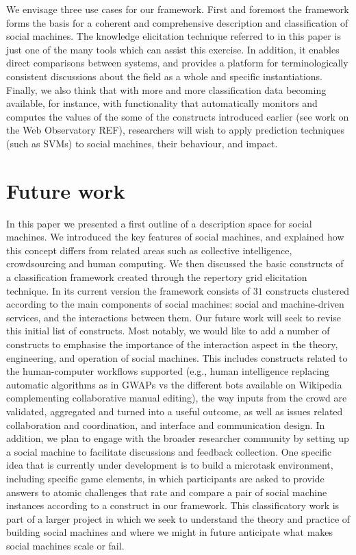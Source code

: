 \documentclass{www13-companion-accepted}
\begin{document}
We envisage three use cases for our framework. First and foremost the framework forms the basis for a coherent and comprehensive description and classification of social machines. The knowledge elicitation technique referred to in this paper is just one of the many tools which can assist this exercise. In addition, it enables direct comparisons between systems, and provides a platform for terminologically consistent discussions about the field as a whole and specific instantiations. Finally, we also think that with more and more classification data becoming available, for instance, with functionality that automatically monitors and computes the values of the some of the constructs introduced earlier (see work on the Web Observatory REF), researchers will wish to apply prediction techniques (such as SVMs) to social machines, their behaviour, and impact.

\section{Future work}
In this paper we presented a first outline of a description space for social machines. We introduced the key features of social machines, and explained how this concept differs from related areas such as collective intelligence, crowdsourcing and human computing. We then discussed the basic constructs of a classification framework created through the repertory grid elicitation technique. In its current version the framework consists of $31$ constructs clustered according to the main components of social machines: social and machine-driven services, and the interactions between them. Our future work will seek to revise this initial list of constructs. Most notably, we would like to add a number of constructs to emphasise the importance of the interaction aspect in the theory, engineering, and operation of social machines. This includes constructs related to the human-computer workflows supported (e.g., human intelligence replacing automatic algorithms as in GWAPs vs the different bots available on Wikipedia complementing collaborative manual editing), the way inputs from the crowd are validated, aggregated and turned into a useful outcome, as well as issues related collaboration and coordination, and interface and communication design. In addition, we plan to engage with the broader researcher community by setting up a social machine to facilitate discussions and feedback collection. One specific idea that is currently under development is to build a microtask environment, including specific game elements, in which participants are asked to provide answers to atomic challenges that rate and compare a pair of social machine instances according to a construct in our framework. This classificatory work is part of a larger project in which we seek to understand the theory and practice of building social machines and where we might in future anticipate what makes social machines scale or fail.
\end{document}
